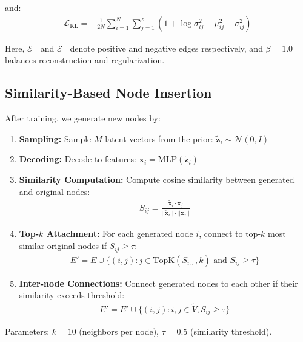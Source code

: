 \documentclass[12pt]{article}
\begin{document}
and:
\begin{align}
\mathcal{L}_{\text{KL}} = -\frac{1}{2N} \sum_{i=1}^{N} \sum_{j=1}^{z} (1 + \log\sigma_{ij}^2 - \mu_{ij}^2 - \sigma_{ij}^2)
\end{align}

Here, $\mathcal{E}^+$ and $\mathcal{E}^-$ denote positive and negative edges respectively, and $\beta = 1.0$ balances reconstruction and regularization.

\subsection{Similarity-Based Node Insertion}

After training, we generate new nodes by:

\begin{enumerate}
    \item \textbf{Sampling:} Sample $M$ latent vectors from the prior: $\tilde{\mathbf{z}}_i \sim \mathcal{N}(0, I)$
    
    \item \textbf{Decoding:} Decode to features: $\tilde{\mathbf{x}}_i = \text{MLP}(\tilde{\mathbf{z}}_i)$
    
    \item \textbf{Similarity Computation:} Compute cosine similarity between generated and original nodes:
    \begin{align}
    S_{ij} = \frac{\tilde{\mathbf{x}}_i \cdot \mathbf{x}_j}{||\tilde{\mathbf{x}}_i|| \cdot ||\mathbf{x}_j||}
    \end{align}
    
    \item \textbf{Top-$k$ Attachment:} For each generated node $i$, connect to top-$k$ most similar original nodes if $S_{ij} \geq \tau$:
    \begin{align}
    E' = E \cup \{(i, j) : j \in \text{TopK}(S_{i,:}, k) \text{ and } S_{ij} \geq \tau\}
    \end{align}
    
    \item \textbf{Inter-node Connections:} Connect generated nodes to each other if their similarity exceeds threshold:
    \begin{align}
    E' = E' \cup \{(i, j) : i, j \in \tilde{V}, S_{ij} \geq \tau\}
    \end{align}
\end{enumerate}

Parameters: $k = 10$ (neighbors per node), $\tau = 0.5$ (similarity threshold).
\end{document}
